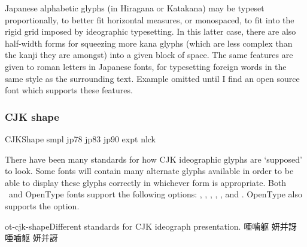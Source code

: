 \documentclass[a4paper]{l3doc}
\begin{document}
Japanese alphabetic glyphs (in Hiragana or Katakana) may be typeset
proportionally, to better fit horizontal measures, or monospaced, to
fit into the rigid grid imposed by ideographic typesetting. In this
latter case, there are also half-width forms for squeezing more kana
glyphs (which are less complex than the kanji they are amongst) into
a given block of space. The same features are given to roman letters
in Japanese fonts, for typesetting foreign words in the same style
as the surrounding text. Example omitted until I find an open source
font which supports these features.




\subsubsection{CJK shape}

\begin{features}{CJKShape}
 {smpl}
    {jp78}
    {jp83}
    {jp90}
     {expt}
        {nlck}
\end{features}

There have been many standards for how CJK ideographic
glyphs are `supposed' to look. Some fonts will contain many alternate
glyphs available in order to be able to display these glyphs
correctly in whichever form is appropriate. Both \AAT\ and OpenType
fonts support the following  options:
, , , ,
, and . OpenType also supports the  option.

\begin{Xexample}[firstline=2]{ot-cjk-shape}{Different standards for CJK ideograph presentation.}
  \LARGE\def\text{\noindent 唖噛躯 妍并訝}
  {
  \text }                          \\
  {
  \text }                          
\end{Xexample}
\end{document}
